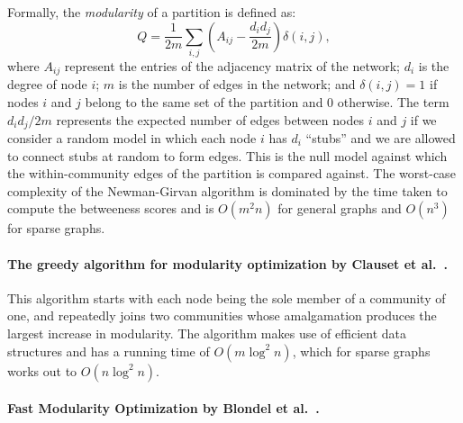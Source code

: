 Formally, the \emph{modularity} of a partition is defined as:
\begin{equation}\label{eqn:modularity}
	Q = \frac{1}{2m} \sum_{i, j} \left ( A_{i j} - \frac{d_i d_j}{2m} \right ) \delta(i, j),
\end{equation}
where $A_{ij}$ represent the entries of the adjacency matrix of the network; $d_i$ is the 
degree of node $i$; $m$ is the number of edges in the network; and $\delta(i, j) = 1$ if nodes
$i$ and $j$ belong to the same set of the partition and $0$ otherwise. The term $d_i d_j / 2m$ 
represents the expected number of edges between nodes $i$ and $j$ if we consider a random model
in which each node $i$ has $d_i$ ``stubs'' and we are allowed to connect stubs at random to form edges. 
This is the null model against which the within-community edges of the partition is compared against.
The worst-case complexity of the Newman-Girvan algorithm is dominated by the time taken 
to compute the betweeness scores and is $O(m^2 n)$ for general graphs and $O(n^3)$ for sparse graphs.

\paragraph{The greedy algorithm for modularity optimization by Clauset et al.~\cite{CNM04}.}
This algorithm starts with each node being the sole member of a community of one, and 
repeatedly joins two communities whose amalgamation produces the largest increase in modularity. 
The algorithm makes use of efficient data structures and has a running time of $O(m \log^2 n)$, 
which for sparse graphs works out to $O(n \log^2 n)$. 

\paragraph{Fast Modularity Optimization by Blondel et al.~\cite{BGLL08}.} 


